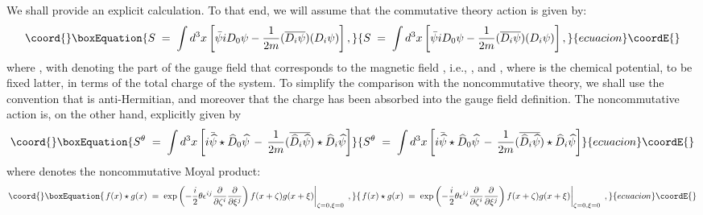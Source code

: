 \documentclass[a4paper,12pt]{article}
\begin{document}
We shall provide an explicit calculation. To that end, we will assume
that the commutative theory action \coordHE{} is given by:
\begin{equation}\coord{}\boxEquation{
S\;=\;\int d^3x \left[ {\bar \psi} i D_0 \psi -\frac{1}{2m}( \overline{D_i \psi})  (D_i \psi) 
\right],
}{
S\;=\;\int d^3x \left[ {\bar \psi} i D_0 \psi -\frac{1}{2m}( \overline{D_i \psi})  (D_i \psi) 
\right],
}{ecuacion}\coordE{}\end{equation}
where \coordHE{}, with \coordHE{} denoting the part of
the gauge field that corresponds to the magnetic field \coordHE{}, i.e.,
\coordHE{}, and \mbox{\coordHE{}}, 
where \myHighlight{$\mu$}\coordHE{} is the chemical potential, to be fixed latter, in terms of 
the total charge of the system.  To simplify the comparison with the
noncommutative theory, we shall use the convention that \coordHE{} is
anti-Hermitian, and moreover that the charge \coordHE{} has been absorbed 
into the gauge field definition.
The noncommutative action \coordHE{} is, on the other hand, explicitly
given by
\begin{equation}\coord{}\boxEquation{
S^\theta\;=\;\int d^3 x \left[ {i \bar {\widehat{\psi}}} \star {\widehat D}_0 
{\widehat \psi} \,-\, 
\frac{1}{2m}  (\overline {{\widehat D}_i {\widehat  \psi}}) \star {\widehat D}_i 
{\widehat \psi} \right]
}{
S^\theta\;=\;\int d^3 x \left[ {i \bar {\widehat{\psi}}} \star {\widehat D}_0 
{\widehat \psi} \,-\, 
\frac{1}{2m}  (\overline {{\widehat D}_i {\widehat  \psi}}) \star {\widehat D}_i 
{\widehat \psi} \right]
}{ecuacion}\coordE{}\end{equation}
where \myHighlight{$\star$}\coordHE{} denotes the noncommutative Moyal product:
\begin{equation}\coord{}\boxEquation{
\left.  f(x)\star g(x) \;=\; \exp \left( -\frac{i}{2}\theta \epsilon^{ij}
\frac{\partial}{\partial \zeta^i} \frac{\partial}{\partial \xi^j} \right)
f(x+\zeta)g(x+\xi) \right|_{\zeta=0,\xi=0} \;,
}{
\left.  f(x)\star g(x) \;=\; \exp \left( -\frac{i}{2}\theta \epsilon^{ij}
\frac{\partial}{\partial \zeta^i} \frac{\partial}{\partial \xi^j} \right)
f(x+\zeta)g(x+\xi) \right|_{\zeta=0,\xi=0} \;,
}{ecuacion}\coordE{}\end{equation}
\end{document}
